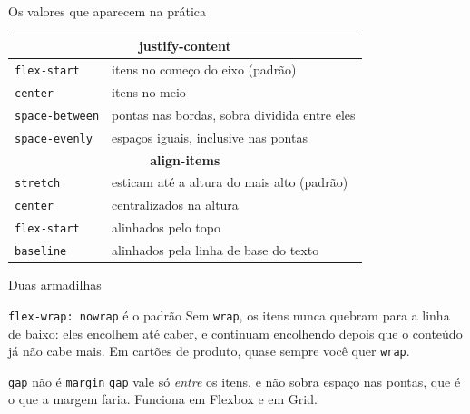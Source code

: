 \documentclass{beamer}
\begin{document}
\begin{frame}{Os valores que aparecem na prática}
	\begin{center}
		\begin{tabular}{ll}
			\toprule
			\multicolumn{2}{c}{\textbf{justify-content}}                            \\
			\midrule
			\texttt{flex-start}    & itens no começo do eixo (padrão)               \\
			\texttt{center}        & itens no meio                                  \\
			\texttt{space-between} & pontas nas bordas, sobra dividida entre eles   \\
			\texttt{space-evenly}  & espaços iguais, inclusive nas pontas           \\
			\midrule
			\multicolumn{2}{c}{\textbf{align-items}}                                \\
			\midrule
			\texttt{stretch}       & esticam até a altura do mais alto (padrão)     \\
			\texttt{center}        & centralizados na altura                        \\
			\texttt{flex-start}    & alinhados pelo topo                            \\
			\texttt{baseline}      & alinhados pela linha de base do texto          \\
			\bottomrule
		\end{tabular}
	\end{center}
\end{frame}

\begin{frame}{Duas armadilhas}
	\begin{block}{\texttt{flex-wrap: nowrap} é o padrão}
		Sem \texttt{wrap}, os itens nunca quebram para a linha de baixo: eles
		encolhem até caber, e continuam encolhendo depois que o conteúdo já não
		cabe mais. Em cartões de produto, quase sempre você quer \texttt{wrap}.
	\end{block}

	\vspace{0.4cm}
	\begin{block}{\texttt{gap} não é \texttt{margin}}
		\texttt{gap} vale só \emph{entre} os itens, e não sobra espaço nas pontas,
		que é o que a margem faria. Funciona em Flexbox e em Grid.
	\end{block}
\end{frame}
\end{document}
